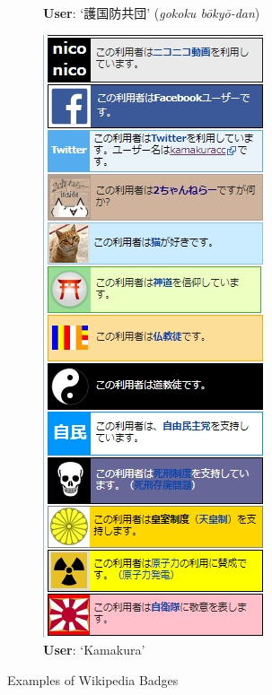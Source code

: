 \documentclass[10pt,british,A4paper,,openany]{memoir}
\begin{document}
\begin{figure}[!htb]
\begin{subfigure}[b]{0.3\textwidth}
  \caption{\textbf{User}: `護国防共団' (\textit{gokoku bōkyō-dan})}
  \label{fig:defense-corps}
 \end{subfigure}
 \begin{subfigure}[b]{0.3\textwidth}
  \includegraphics[width=\textwidth]{images/wiki/kamakura.jpg}
  \caption{\textbf{User}: `Kamakura'}
  \label{fig:kamakura}
 \end{subfigure}
 \caption{Examples of Wikipedia Badges}\label{fig:badge-examples}
\end{figure}
\end{document}

